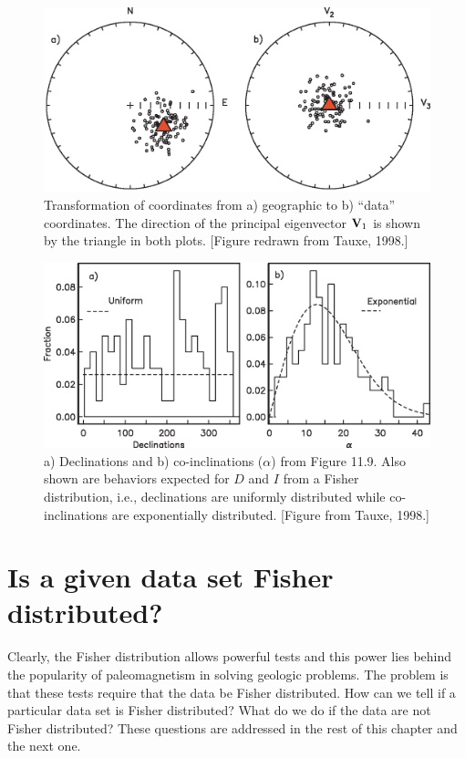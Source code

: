 \begin{figure}[h!tb]
\centering  \includegraphics[width= 12.5 cm]{EPSfiles/fishrot.eps}
\caption{
Transformation of coordinates from a) geographic  to b) ``data'' coordinates.
 The
direction of the principal eigenvector $\hbox{\bf V}_1$ is shown by the triangle
in both plots.  [Figure redrawn from Tauxe, 1998.]}
\label{fig:fishrot}
\end{figure}


\begin{figure}[htb]
\centering  \includegraphics[width= 12 cm]{EPSfiles/unexp.eps}
\caption{
a) Declinations and b) co-inclinations ($\alpha$) from Figure 11.9. 
 Also shown are behaviors
expected for $D$ and $I$ from a Fisher distribution, i.e., declinations are
uniformly distributed while co-inclinations are exponentially distributed. 
[Figure from Tauxe, 1998.]}
\label{fig:unexp}
\end{figure}


\section {Is a given data set Fisher distributed?}
\label{sect:fishtests}

Clearly, the Fisher distribution allows powerful tests and this power lies
behind the popularity of paleomagnetism in solving geologic problems.  The
problem is that these tests require that the data be Fisher distributed.
How can we tell if a particular data set is Fisher distributed? 
 What do we do if the data are not Fisher distributed?  
These questions are addressed in  the rest of this chapter and the next one.  

